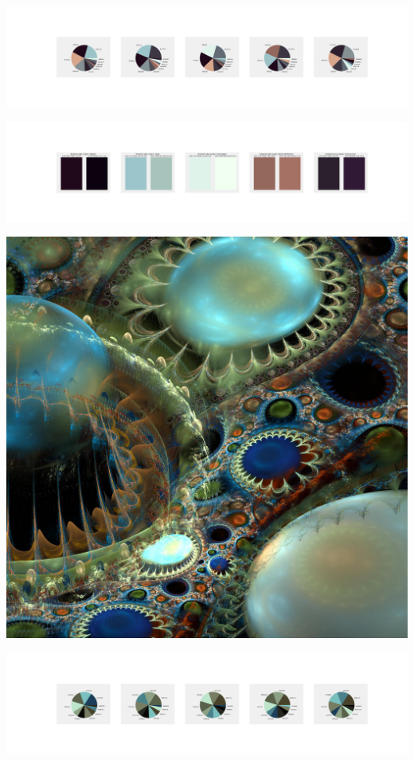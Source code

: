 \documentclass[11pt]{article}
\begin{document}
\begin{landscape}
    \begin{center}
    \includegraphics[width=250mm]{./nbimg/pie-428.jpg}
    \end{center}

    \begin{center}
    \includegraphics[width=250mm]{./nbimg/peak-428.jpg}
    \end{center}
    

    \begin{center}
    \includegraphics[width=\textwidth]{./nbimg/file (8).jpg}
    \end{center}

    \begin{center}
    \includegraphics[width=250mm]{./nbimg/pie-429.jpg}
    \end{center}


\end{landscape}
\end{document}
